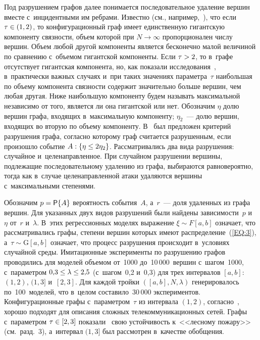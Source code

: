 \begin{multicols}{2}
Под разрушением графов далее понимается по\-сле\-до\-ва\-тель\-ное удаление вер\-шин вместе
с~инцидентными им реб\-ра\-ми. Известно (см., например,~\cite{RN1}), что если
$\tau\hm\in(1,2)$, то конфигурационный граф имеет единственную гигантскую компоненту
связ\-ности, объем которой при $N\rightarrow\infty$ пропорционален чис\-лу вершин.
Объем любой другой компоненты является бесконечно малой величиной по срав\-не\-нию с~объемом гигантской компоненты. Если $\tau\hm>2$, то в~графе отсутствует гигантская
компонента, но, как показали исследования~\cite{Ler1,Ler3}, в~практически
важ\-ных случаях и~при таких значениях па\-ра\-мет\-ра~$\tau$ наибольшая по объему компонента
связности содержит значительно больше вершин, чем любая другая. Ниже наибольшую
компоненту будем называть максимальной независимо от того, является ли она гигантской
или нет. Обозначим $\eta$ долю вершин графа, входящих в~максимальную компоненту; 
$\eta_2$~--- долю вершин, входящих во вторую по объему компоненту. В~\cite{Ler1}
был предложен критерий разрушения графа, со\-глас\-но которому граф считается разрушенным,
если произошло событие ${A}:\{\eta\hm\leq 2\eta_2\}$. Рас\-смат\-ри\-ва\-лись два вида
разрушения: 
случайное и~целенаправленное. При случайном разрушении вершины, подлежащие
по\-сле\-до\-ва\-тель\-но\-му удалению из графа, выбираются равновероятно, 
тогда как в~случае
целенаправленной атаки удаляются вершины с~максимальными степенями.


Обозначим $p={\sf P}\{{A}\}$ ве\-ро\-ят\-ность события~${A}$, а~$r$~--- доля
удаленных из графа вершин. 
Для указанных двух видов разрушений были найдены зависимости~$p$ 
и~$\eta$ от~$r$ и~$\lambda$. В~этих регрессионных моделях выражение $\xi\sim F[a,b]$
означает, что рас\-смат\-ри\-ва\-лись графы, степени вершин которых имеют распределение~(\ref{EQ:3}),
а~$\tau\sim\mathrm{G}[a,b]$ означает, что процесс разрушения происходит в~условиях случайной
среды. Имитационные эксперименты по разрушению графов проводились для моделей объемом
от~1000 до~10\,000~вершин с~шагом~1000, с~параметром $0{,}3\hm\leq\lambda\hm\leq 2{,}5$
(с~шагом~0,2 и~0,3) для трех интервалов $[a,b]$: $(1,2)$, $(1,3]$ и~$[2,3]$. 
Для каждой
тройки $([a,b],N,\lambda)$ генерировалось по~100~моделей, что в~целом 
со\-ста\-ви\-ло~30\,000
экспериментов. Конфигурационные графы с~па\-ра\-мет\-ром~$\tau$ из интервала $(1,2)$, 
со\-глас\-но~\cite{Fa,RN1}, хорошо подходят для описания сложных телекоммуникационных 
сетей. Графы
с~па\-ра\-мет\-ром $\tau\hm\in[2,3]$ показали~\cite{Ler1,Ler3,Ler2} свою
 устой\-чи\-вость к~<<лесному пожару>>
(см.\ разд.~3), а~интервал $(1,3]$ был рас\-смот\-рен в~качестве обобщения.




\end{multicols}

